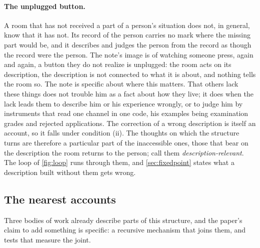 \paragraph{The unplugged button.} A room that has not received a part of a person's situation does not, in general, know that it has not. Its record of the person carries no mark where the missing part would be, and it describes and judges the person from the record as though the record were the person. The note's image is of watching someone press, again and again, a button they do not realize is unplugged: the room acts on its description, the description is not connected to what it is about, and nothing tells the room so. The note is specific about where this matters. That others lack these things does not trouble him as a fact about how they live; it does when the lack leads them to describe him or his experience wrongly, or to judge him by instruments that read one channel in one code, his examples being examination grades and rejected applications. The correction of a wrong description is itself an account, so it falls under condition (ii). The thoughts on which the structure turns are therefore a particular part of the inaccessible ones, those that bear on the description the room returns to the person; call them \emph{description-relevant}. The loop of \autoref{fig:loop} runs through them, and \autoref{sec:fixedpoint} states what a description built without them gets wrong.

\subsection{The nearest accounts}

Three bodies of work already describe parts of this structure, and the paper's claim to add something is specific: a recursive mechanism that joins them, and tests that measure the joint.

